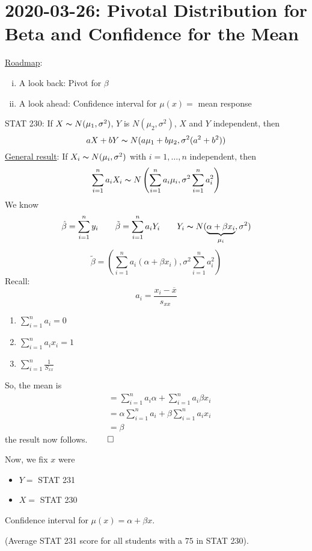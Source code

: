 \section{2020-03-26: Pivotal Distribution for Beta and Confidence for the Mean}
\underline{Roadmap}:
\begin{enumerate}[(i)]
    \item A look back: Pivot for $ \beta $
    \item A look ahead: Confidence interval for $ \mu(x)= $ mean response
\end{enumerate}
STAT 230: If $ X \thicksim N(\mu_1, \sigma^2) $, $ Y $ is $ N(\mu_2,\sigma^2) $,
$ X $ and $ Y $ independent, then
\[ aX+bY \thicksim N(a\mu_1+b\mu_2,\sigma^2(a^2+b^2)) \]
\underline{General result}: If $ X_i \thicksim N(\mu_i,\sigma^2) $
with $ i=1,\ldots ,n $ independent, then
\[ \sum\limits_{i=1}^{n} a_iX_i \thicksim N\left(\sum\limits_{i=1}^{n} a_i\mu_i,
    \sigma^2 \sum\limits_{i=1}^{n} a_i^2\right) \]
We know
\[ \hat{\beta}=\sum\limits_{i=1}^{n} y_i\qquad
    \tilde{\beta}=\sum\limits_{i=1}^{n} a_iY_i\qquad
    Y_i \thicksim N(\underbrace{\alpha+\beta x_i}_{\mu_i},\sigma^2) \]
\[ \tilde{\beta}=\left( \sum\limits_{i=1}^{n} a_i(\alpha+\beta x_i),
    \sigma^2 \sum\limits_{i=1}^{n} a_i^2 \right) \]
Recall:
\[ a_i=\frac{x_i-\overline{x}}{s_{xx}}  \]
\begin{enumerate}
    \item $ \sum\limits_{i=1}^{n} a_i=0 $
    \item $ \sum\limits_{i=1}^{n} a_ix_i=1 $
    \item $ \sum\limits_{i=1}^{n} \frac{1}{S_{xx}} $
\end{enumerate}
So, the mean is
\begin{align*}
     & =\sum\limits_{i=1}^{n} a_i\alpha+\sum\limits_{i=1}^{n} a_i\beta x_i     \\
     & =\alpha \sum\limits_{i=1}^{n} a_i + \beta \sum\limits_{i=1}^{n} a_i x_i \\
     & =\beta
\end{align*}
the result now follows.
$ \qed $

Now, we fix $ x $ were
\begin{itemize}
    \item $ Y= $ STAT 231
    \item $ X= $ STAT 230
\end{itemize}
Confidence interval for $ \mu(x)=\alpha+\beta x $.

(Average STAT 231 score for all students with a $ 75 $ in STAT 230).

